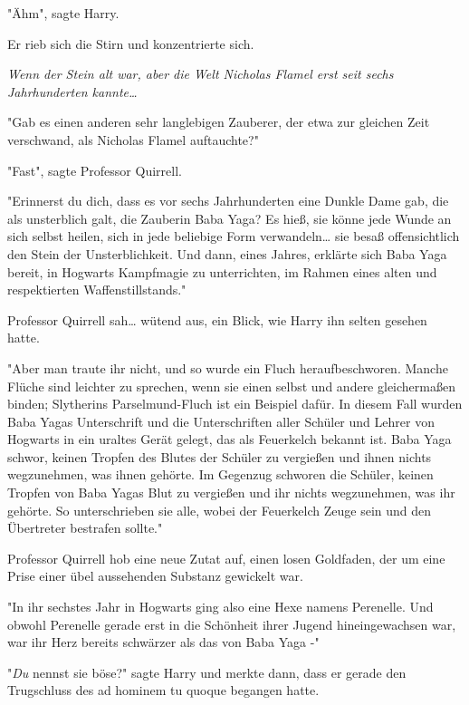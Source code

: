 {"Ähm", sagte Harry.

Er rieb sich die Stirn und konzentrierte sich.

\emph{Wenn der Stein alt war, aber die Welt Nicholas Flamel erst seit sechs Jahrhunderten kannte…}

"Gab es einen anderen sehr langlebigen Zauberer, der etwa zur gleichen Zeit verschwand, als Nicholas Flamel auftauchte?"

"Fast", sagte Professor Quirrell.

"Erinnerst du dich, dass es vor sechs Jahrhunderten eine Dunkle Dame gab, die als unsterblich galt, die Zauberin Baba Yaga? Es hieß, sie könne jede Wunde an sich selbst heilen, sich in jede beliebige Form verwandeln… sie besaß offensichtlich den Stein der Unsterblichkeit. Und dann, eines Jahres, erklärte sich Baba Yaga bereit, in Hogwarts Kampfmagie zu unterrichten, im Rahmen eines alten und respektierten Waffenstillstands."

Professor Quirrell sah… wütend aus, ein Blick, wie Harry ihn selten gesehen hatte.

"Aber man traute ihr nicht, und so wurde ein Fluch heraufbeschworen. Manche Flüche sind leichter zu sprechen, wenn sie einen selbst und andere gleichermaßen binden; Slytherins Parselmund-Fluch ist ein Beispiel dafür. In diesem Fall wurden Baba Yagas Unterschrift und die Unterschriften aller Schüler und Lehrer von Hogwarts in ein uraltes Gerät gelegt, das als Feuerkelch bekannt ist. Baba Yaga schwor, keinen Tropfen des Blutes der Schüler zu vergießen und ihnen nichts wegzunehmen, was ihnen gehörte. Im Gegenzug schworen die Schüler, keinen Tropfen von Baba Yagas Blut zu vergießen und ihr nichts wegzunehmen, was ihr gehörte. So unterschrieben sie alle, wobei der Feuerkelch Zeuge sein und den Übertreter bestrafen sollte."

Professor Quirrell hob eine neue Zutat auf, einen losen Goldfaden, der um eine Prise einer übel aussehenden Substanz gewickelt war.

"In ihr sechstes Jahr in Hogwarts ging also eine Hexe namens Perenelle. Und obwohl Perenelle gerade erst in die Schönheit ihrer Jugend hineingewachsen war, war ihr Herz bereits schwärzer als das von Baba Yaga -"

"\emph{Du} nennst sie böse?" sagte Harry und merkte dann, dass er gerade den Trugschluss des ad hominem tu quoque begangen hatte.

}
